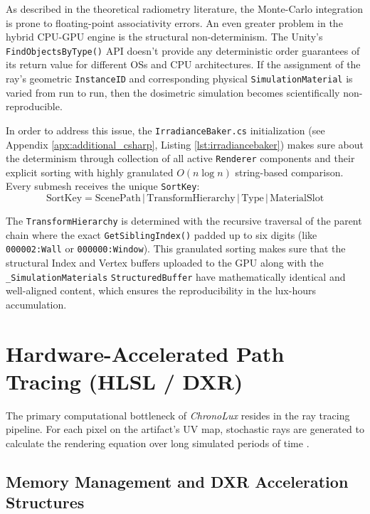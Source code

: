 As described in the theoretical radiometry literature, the Monte-Carlo integration is prone to floating-point associativity errors. An even greater problem in the hybrid CPU-GPU engine is the structural non-determinism. The Unity’s \texttt{FindObjectsByType()} API doesn’t provide any deterministic order guarantees of its return value for different OSs and CPU architectures. If the assignment of the ray’s geometric \texttt{InstanceID} and corresponding physical \texttt{SimulationMaterial} is varied from run to run, then the dosimetric simulation becomes scientifically non-reproducible.

In order to address this issue, the \texttt{IrradianceBaker.cs} initialization (see Appendix \ref{apx:additional_csharp}, Listing \ref{lst:irradiancebaker}) makes sure about the determinism through collection of all active \texttt{Renderer} components and their explicit sorting with highly granulated $O(n \log n)$ string-based comparison. Every submesh receives the unique \texttt{SortKey}:
\begin{equation}
    \text{SortKey} = \text{ScenePath} \,|\, \text{TransformHierarchy} \,|\, \text{Type} \,|\, \text{MaterialSlot}
\end{equation}

The \texttt{TransformHierarchy} is determined with the recursive traversal of the parent chain where the exact \texttt{GetSiblingIndex()} padded up to six digits (like \texttt{000002:Wall} or \texttt{000000:Window}). This granulated sorting makes sure that the structural Index and Vertex buffers uploaded to the GPU along with the \texttt{\_SimulationMaterials} \texttt{StructuredBuffer} have mathematically identical and well-aligned content, which ensures the reproducibility in the lux-hours accumulation.

\section{Hardware-Accelerated Path Tracing (HLSL / DXR)}

The primary computational bottleneck of \textit{ChronoLux} resides in the ray tracing pipeline. For each pixel on the artifact’s UV map, stochastic rays are generated to calculate the rendering equation over long simulated periods of time \cite{kajiya1986rendering}.

\subsection{Memory Management and DXR Acceleration Structures}

